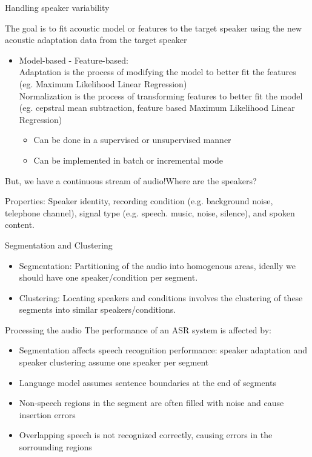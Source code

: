 \begin{frame}{Handling speaker variability}

The goal is to fit acoustic model or features to the target speaker using the new acoustic adaptation data from the target speaker

\begin{itemize}

\item {\color{blue} Model-based - Feature-based:} \\
{\color{red} Adaptation} is the process of modifying the model to better fit the features  (eg. Maximum Likelihood Linear Regression)\\
{\color{red} Normalization}  is the process of transforming features to better fit  the model (eg. cepstral mean subtraction, feature based Maximum Likelihood Linear Regression)\\
\begin{itemize}
\item Can be done in a supervised or unsupervised manner
\item Can be implemented in batch or incremental mode
\end{itemize}
\end{itemize}
\end{frame}


\begin{frame}{But, we have a continuous stream of audio!}{Where are the speakers?}

{\color{blue} Properties:} Speaker identity, recording condition (e.g. background noise, telephone channel),
signal type (e.g. speech. music, noise, silence), and spoken content.

Segmentation and Clustering
\begin{itemize}
\item {\color{red} Segmentation:} Partitioning of the audio into homogenous areas, ideally we should have one speaker/condition per segment.
\item {\color{red} Clustering:} Locating speakers and conditions involves the clustering of these segments into similar speakers/conditions.
\end{itemize}
\end{frame}

\begin{frame}{Processing the audio}
The performance of an ASR system is affected by:
\begin{itemize}
\item Segmentation affects speech recognition performance: speaker adaptation and speaker clustering assume one speaker per segment
\item Language model assumes sentence boundaries at the end of segments
\item Non-speech regions in the segment are often filled with noise and cause insertion errors
\item Overlapping speech is not recognized correctly, causing errors in the sorrounding regions
\end{itemize}
\end{frame}

